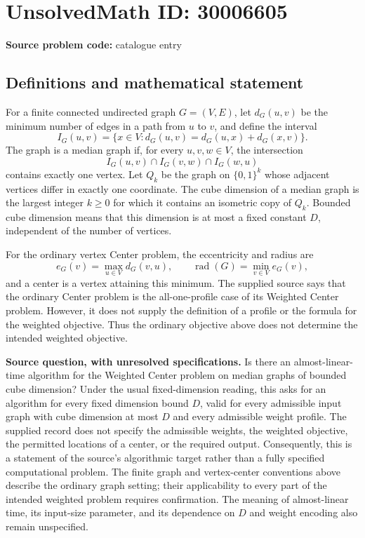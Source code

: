 \documentclass[11pt]{article}
\begin{document}
\section*{UnsolvedMath ID: 30006605}
\textbf{Source problem code:} catalogue entry
\subsection{Definitions and mathematical statement}
For a finite connected undirected graph \(G=(V,E)\), let \(d_G(u,v)\) be the minimum number of edges in a path from \(u\) to \(v\), and define the interval
\[
I_G(u,v)=\{x\in V:d_G(u,v)=d_G(u,x)+d_G(x,v)\}.
\]
The graph is a median graph if, for every \(u,v,w\in V\), the intersection
\[
I_G(u,v)\cap I_G(v,w)\cap I_G(w,u)
\]
contains exactly one vertex. Let \(Q_k\) be the graph on \(\{0,1\}^k\) whose adjacent vertices differ in exactly one coordinate. The cube dimension of a median graph is the largest integer \(k\geq 0\) for which it contains an isometric copy of \(Q_k\). Bounded cube dimension means that this dimension is at most a fixed constant \(D\), independent of the number of vertices.

For the ordinary vertex Center problem, the eccentricity and radius are
\[
e_G(v)=\max_{u\in V}d_G(v,u),\qquad
\operatorname{rad}(G)=\min_{v\in V}e_G(v),
\]
and a center is a vertex attaining this minimum. The supplied source says that the ordinary Center problem is the all-one-profile case of its Weighted Center problem. However, it does not supply the definition of a profile or the formula for the weighted objective. Thus the ordinary objective above does not determine the intended weighted objective.

\textbf{Source question, with unresolved specifications.} Is there an almost-linear-time algorithm for the Weighted Center problem on median graphs of bounded cube dimension? Under the usual fixed-dimension reading, this asks for an algorithm for every fixed dimension bound \(D\), valid for every admissible input graph with cube dimension at most \(D\) and every admissible weight profile. The supplied record does not specify the admissible weights, the weighted objective, the permitted locations of a center, or the required output. Consequently, this is a statement of the source's algorithmic target rather than a fully specified computational problem. The finite graph and vertex-center conventions above describe the ordinary graph setting; their applicability to every part of the intended weighted problem requires confirmation. The meaning of almost-linear time, its input-size parameter, and its dependence on \(D\) and weight encoding also remain unspecified.
\end{document}
